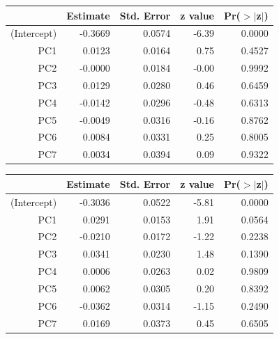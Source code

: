 \documentclass[a4paper,12pt]{Latex/Classes/PhDthesisPSnPDF}
\begin{document}
\newpage
\begin{center}
\begin{table}[ht]
\centering
\begin{tabular}{rrrrr}
  \hline
 & Estimate & Std. Error & z value & Pr($>$$|$z$|$) \\ 
  \hline
(Intercept) & -0.3669 & 0.0574 & -6.39 & 0.0000 \\ 
  PC1 & 0.0123 & 0.0164 & 0.75 & 0.4527 \\ 
  PC2 & -0.0000 & 0.0184 & -0.00 & 0.9992 \\ 
  PC3 & 0.0129 & 0.0280 & 0.46 & 0.6459 \\ 
  PC4 & -0.0142 & 0.0296 & -0.48 & 0.6313 \\ 
  PC5 & -0.0049 & 0.0316 & -0.16 & 0.8762 \\ 
  PC6 & 0.0084 & 0.0331 & 0.25 & 0.8005 \\ 
  PC7 & 0.0034 & 0.0394 & 0.09 & 0.9322 \\ 
   \hline
\end{tabular}
\end{table}\end{center}
\begin{center}
\begin{table}[ht]
\centering
\begin{tabular}{rrrrr}
  \hline
 & Estimate & Std. Error & z value & Pr($>$$|$z$|$) \\ 
  \hline
(Intercept) & -0.3036 & 0.0522 & -5.81 & 0.0000 \\ 
  PC1 & 0.0291 & 0.0153 & 1.91 & 0.0564 \\ 
  PC2 & -0.0210 & 0.0172 & -1.22 & 0.2238 \\ 
  PC3 & 0.0341 & 0.0230 & 1.48 & 0.1390 \\ 
  PC4 & 0.0006 & 0.0263 & 0.02 & 0.9809 \\ 
  PC5 & 0.0062 & 0.0305 & 0.20 & 0.8392 \\ 
  PC6 & -0.0362 & 0.0314 & -1.15 & 0.2490 \\ 
  PC7 & 0.0169 & 0.0373 & 0.45 & 0.6505 \\ 
   \hline
\end{tabular}
\end{table}\end{center}
\end{document}
